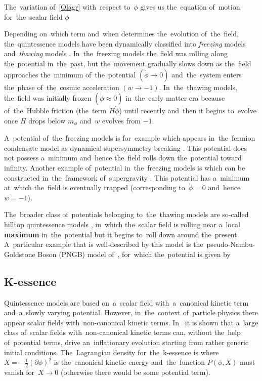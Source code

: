 The~variation of~\eqref{Qlagr} with~respect to~$\phi$ gives us the~equation of~motion for~the~scalar field $\phi$

Depending on~which term and~when determines the~evolution of~the~field, the~quintessence models have been dynamically classified into \textit{freezing} models and~\textit{thawing} models \parencite{2005PhRvL..95n1301C}. In~the~freezing models the~field was rolling along the~potential in~the~past, but the~movement gradually slows down as the~field approaches the~minimum of~the~potential $(\dot{\phi}\rightarrow0)$ and~the~system enters the~phase of~the~cosmic acceleration $(w\rightarrow-1)$. In~the~thawing models, the~field was initially frozen $(\dot{\phi}\approx0)$ in~the~early matter era because of~the~Hubble friction (the~term $H\dot{\phi}$) until recently and~then it begins to~evolve once $H$ drops below $m_\phi$ and~$w$ evolves from $-1$.

A~potential of~the~freezing models is for~example
which appears in~the~fermion condensate model as dynamical supersymmetry breaking \parencite{1999PhRvD..60f3502B}. This potential does not possess a~minimum and~hence the~field rolls down the~potential toward infinity. Another example of~potential in~the~freezing models is
which can be constructed in~the~framework of~supergravity \parencite{1999PhLB..468...40B}. This potential has a~minimum at~which the~field is eventually trapped (corresponding to~$\dot{\phi}=0$ and~hence $w=-1$).

The~broader class of~potentials belonging to~the~thawing models are so-called hilltop quintessence models \parencite{2008PhRvD..78l3525D}, in~which the~scalar field is rolling near a~local \textbf{maximum} in~the~potential but it begins to~roll down around the~present. A~particular example that is well-described by this model is the~pseudo-Nambu-Goldstone Boson (PNGB) model of~\textcite{1995PhRvL..75.2077F}, for~which the~potential is given by
\subsection{K-essence}
Quintessence models are based on~a~scalar field with~a~canonical kinetic term and~a~slowly varying potential. However, in~the~context of~particle physics there appear scalar fields with~non-canonical kinetic terms. In~\textcite{1999PhLB..458..209A} it is shown that a~large class of~scalar fields with~non-canonical kinetic terms can, without the~help of~potential terms, drive an~inflationary evolution starting from rather generic initial conditions. The~Lagrangian density for~the~k-essence is
where $X=-\frac12(\partial\phi)^2$ is the~canonical kinetic energy and~the~function $P(\phi, X)$ must vanish for~$X\rightarrow0$ (otherwise there would be some potential term). 

